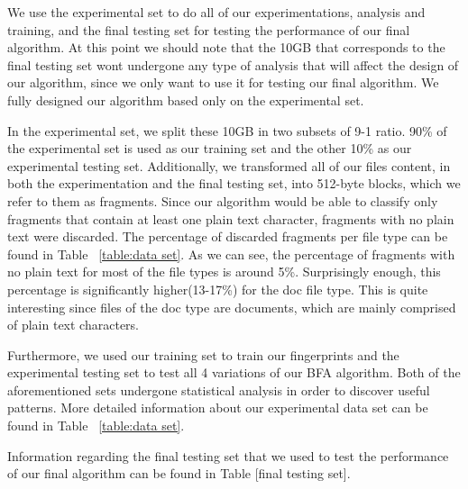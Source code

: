 We use the experimental set to do all of our experimentations, analysis and training,  and the final testing set for testing the performance of our final algorithm.
At this point we should note that the 10GB that corresponds to the final testing set wont undergone any type of analysis that will affect the design of our algorithm, since we only want to use it for testing our final algorithm. We fully designed our algorithm based only on the experimental set.

In the experimental set, we split these 10GB in two subsets of 9-1 ratio.  90\% of the experimental set is used as our training set and the other 10\% as our experimental testing set. Additionally, we transformed all of our files content, in both the experimentation and the final testing set, into 512-byte blocks, which we refer to them as fragments. Since our algorithm would be able to classify only fragments that contain at least one plain text character, fragments with no plain text were discarded. The percentage of discarded fragments per file type can be found in Table ~\ref{table:data set}. As we can see, the percentage of fragments with no plain text for most of the file types is around 5\%. Surprisingly enough, this percentage is significantly higher(13-17\%) for the doc file type. This is quite interesting since files of the doc type are documents, which are mainly comprised of plain text characters.

Furthermore, we used our training set to train our fingerprints and the experimental testing set to test all 4 variations of our BFA algorithm. Both of the aforementioned sets undergone statistical analysis in order to discover useful patterns. More detailed information about our experimental data set can be found in Table ~\ref{table:data set}.


Information regarding the final testing set that we used to test the performance of our final algorithm can be found in Table [final testing set].








